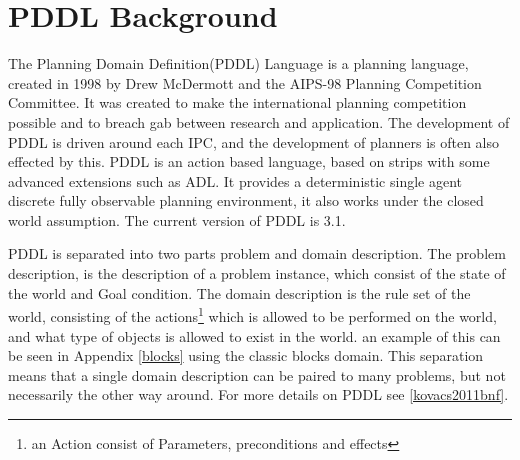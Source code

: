 \section{PDDL Background}
The Planning Domain Definition(PDDL) Language is a planning language, created in 1998 by Drew McDermott and the AIPS-98 Planning Competition Committee. It was created to make the international planning competition possible and to breach gab between research and application. The development of PDDL is driven around each IPC, and the development of planners is often also effected by this.
PDDL is an action based language, based on strips with some advanced extensions such as ADL. It provides a deterministic single agent discrete fully observable planning environment, it also works under the closed world assumption. The current version of PDDL is 3.1.

PDDL is separated into two parts problem and domain description. The problem description, is the description of a problem instance, which consist of the state of the world and Goal condition. The domain description is the rule set of the world, consisting of the actions\footnote{an Action consist of Parameters, preconditions and effects} which is allowed to be performed on the world, and what type of objects is allowed to exist in the world. an example of this can be seen in Appendix \ref{blocks} using the classic blocks domain. This separation means that a single domain description can be paired to many problems, but not necessarily the other way around. For more details on PDDL see \ref{kovacs2011bnf}.
